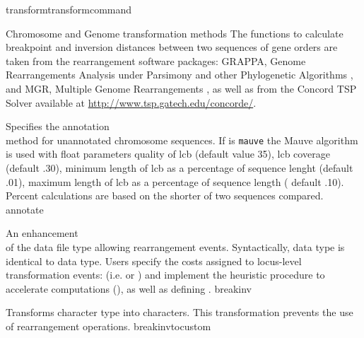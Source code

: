 \begin{command}{transform}{transformcommand}
\begin{arguments}
\begin{argumentgroup}{Chromosome and Genome transformation methods}
            The functions to calculate breakpoint and inversion distances between
            two sequences of gene orders are taken from the rearrangement software
            packages: GRAPPA, Genome Rearrangements Analysis under Parsimony and
            other Phylogenetic Algorithms \cite{baderetal2002}, and MGR, Multiple
            Genome Rearrangements \cite{bourqueandpevzner2002}, as well as from
            the Concord TSP Solver available at \url{http://www.tsp.gatech.edu/concorde/}.

                {Specifies the annotation \\method for unannotated chromosome sequences.
                If \poylident is \texttt{mauve} the Mauve algorithm is used \cite{darlingetal2004} with
                float parameters quality of lcb (default value 35), lcb coverage (default .30), 
                minimum length of lcb as a percentage of sequence lenght (default .01), 
                maximum length of lcb as a percentage of sequence length ( default .10).  
                Percent calculations are based on the shorter of two sequences compared.}
                {annotate}
                        
                {An enhancement \\ of the data file type  allowing
            rearrangement events. Syntactically,  data type is identical to 
             data type. Users specify 
                the costs assigned to locus-level transformation events: (i.e. 
                 or  ) 
                and implement the heuristic  procedure to accelerate computations 
                (), as well as defining .} 
                {breakinv}
                
                {Transforms  character type into  characters.
                This transformation prevents the use of rearrangement operations.}
                 {breakinvtocustom}


\end{argumentgroup}
\end{arguments}
\end{command}
